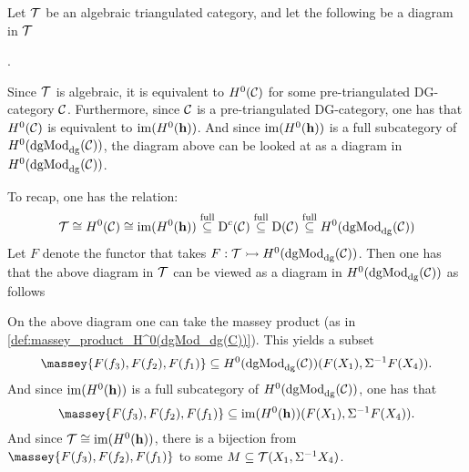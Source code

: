 \begin{remark}
    \label{rem:massey_in_alg_tri_cat}
    Let \( {\mathcal{T}} \) be an algebraic triangulated category, and let the following be a diagram in \( {\mathcal{T}} \)
    \begin{center}
        .
    \end{center}

    Since \( {\mathcal{T}} \) is algebraic, it is equivalent to \( H^0({\mathcal{C}}) \) for some pre-triangulated DG-category \( {\mathcal{C}} \). Furthermore, since \( {\mathcal{C}} \) is a pre-triangulated DG-category, one has that \( H^0({\mathcal{C}}) \) is equivalent to \( \operatorname{im}(H^0(\mathbf{h})) \). And since \( \operatorname{im}(H^0(\mathbf{h})) \) is a full subcategory of \( H^0(\operatorname{dgMod}_{\operatorname{dg}}({\mathcal{C}})) \), the diagram above can be looked at as a diagram in \( H^0(\operatorname{dgMod}_{\operatorname{dg}}({\mathcal{C}})) \).

    To recap, one has the relation:
    \[
        {\mathcal{T}} \cong H^0({\mathcal{C}}) \cong \operatorname{im}(H^0(\mathbf{h})) \stackrel{\text{full}}{\subseteq} \operatorname{D}^c({\mathcal{C}}) \stackrel{\text{full}}{\subseteq} \operatorname{D}({\mathcal{C}}) \stackrel{\text{full}}{\subseteq} H^0(\operatorname{dgMod}_{\operatorname{dg}}({\mathcal{C}}))
    \]
    Let \( F \) denote the functor that takes \( F: {\mathcal{T}} \rightarrowtail H^0(\operatorname{dgMod}_{\operatorname{dg}}({\mathcal{C}})) \). Then one has that the above diagram in \( {\mathcal{T}} \) can be viewed as a diagram in \( H^0(\operatorname{dgMod}_{\operatorname{dg}}({\mathcal{C}})) \) as follows
    \begin{center}
    \end{center}
    
    On the above diagram one can take the massey product (as in \autoref{def:massey_product_H^0(dgMod_dg(C))}). This yields a subset
    \[
        \massey{F(f_3), F(f_2), F(f_1)} \subseteq H^0(\dgMod_{\dg}(\Cc))(F(X_1), \Sigma^{-1} F(X_4)).
    \]
    And since \( \operatorname{im}(H^0(\mathbf{h})) \) is a full subcategory of \( H^0(\operatorname{dgMod}_{\operatorname{dg}}({\mathcal{C}})) \), one has that
    \[
        \massey{F(f_3), F(f_2), F(f_1)} \subseteq \im(H^0(\mathbf{h}))(F(X_1), \Sigma^{-1} F(X_4)).
    \]
    And since \( {\mathcal{T}} \cong \operatorname{im}(H^0(\mathbf{h})) \), there is a bijection from \( \massey{F(f_3), F(f_2), F(f_1)} \) to some \( M \subseteq {\mathcal{T}}(X_1, \Sigma^{-1} X_4) \).


\end{remark}
